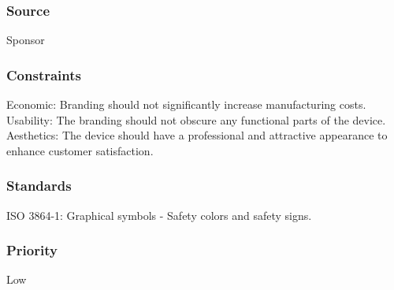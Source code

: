 \subsubsection{Source}
Sponsor
\subsubsection{Constraints}
Economic: Branding should not significantly increase manufacturing costs.\\
Usability: The branding should not obscure any functional parts of the device.\\
Aesthetics: The device should have a professional and attractive appearance to enhance customer satisfaction.
\subsubsection{Standards}
ISO 3864-1: Graphical symbols - Safety colors and safety signs.
\subsubsection{Priority}
Low
